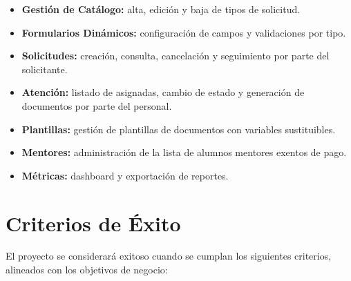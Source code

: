 \documentclass[12pt,letterpaper]{report}
\begin{document}
\begin{itemize}
    \item \textbf{Gestión de Catálogo:} alta, edición y baja de tipos de solicitud.
    \item \textbf{Formularios Dinámicos:} configuración de campos y validaciones por tipo.
    \item \textbf{Solicitudes:} creación, consulta, cancelación y seguimiento por parte del solicitante.
    \item \textbf{Atención:} listado de asignadas, cambio de estado y generación de documentos por parte del personal.
    \item \textbf{Plantillas:} gestión de plantillas de documentos con variables sustituibles.
    \item \textbf{Mentores:} administración de la lista de alumnos mentores exentos de pago.
    \item \textbf{Métricas:} dashboard y exportación de reportes.
\end{itemize}

\chapter{Criterios de Éxito}

El proyecto se considerará exitoso cuando se cumplan los siguientes criterios, alineados con los objetivos de negocio:
\end{document}
